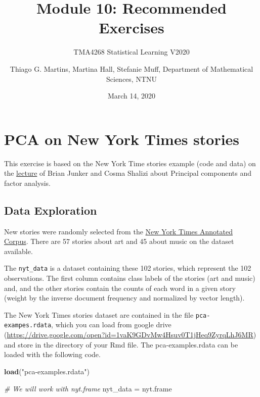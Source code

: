 \documentclass[]{article}
\title{Module 10: Recommended Exercises}
\subtitle{TMA4268 Statistical Learning V2020}
\author{Thiago G. Martins, Martina Hall, Stefanie Muff, Department of
Mathematical Sciences, NTNU}
\date{March 14, 2020}
\newenvironment{Shaded}{\begin{snugshade}}{\end{snugshade}}
\newcommand{\CommentTok}[1]{\textcolor[rgb]{0.56,0.35,0.01}{\textit{#1}}}
\newcommand{\KeywordTok}[1]{\textcolor[rgb]{0.13,0.29,0.53}{\textbf{#1}}}
\newcommand{\NormalTok}[1]{#1}
\newcommand{\OperatorTok}[1]{\textcolor[rgb]{0.81,0.36,0.00}{\textbf{#1}}}
\newcommand{\StringTok}[1]{\textcolor[rgb]{0.31,0.60,0.02}{#1}}
\begin{document}
\maketitle

\hypertarget{pca-on-new-york-times-stories}{%
\section{PCA on New York Times
stories}\label{pca-on-new-york-times-stories}}

This exercise is based on the New York Time stories example (code and
data) on the \href{http://www.stat.cmu.edu/~cshalizi/490/10/}{lecture}
of Brian Junker and Cosma Shalizi about Principal components and factor
analysis.

\hypertarget{data-exploration}{%
\subsection{Data Exploration}\label{data-exploration}}

New stories were randomly selected from the
\href{https://catalog.ldc.upenn.edu/LDC2008T19}{New York Times Annotated
Corpus}. There are 57 stories about art and 45 about music on the
dataset available.

The \texttt{nyt\_data} is a dataset containing these 102 stories, which
represent the 102 observations. The first column contains class labels
of the stories (art and music) and, and the other stories contain the
counts of each word in a given story (weight by the inverse document
frequency and normalized by vector length).

The New York Times stories dataset are contained in the file
\texttt{pca-exampes.rdata}, which you can load from google drive
(\url{https://drive.google.com/open?id=1vaK9GDvMw4Hsuv0T1jHeq9ZyrqLhJ6MR})
and store in the directory of your Rmd file. The pca-examples.rdata can
be loaded with the following code.

\begin{Shaded}
\begin{Highlighting}[]
\KeywordTok{load}\NormalTok{(}\StringTok{"pca-examples.rdata"}\NormalTok{)}

\CommentTok{# We will work with nyt.frame}
\NormalTok{nyt_data =}\StringTok{ }\NormalTok{nyt.frame}
\end{Highlighting}
\end{Shaded}

\begin{Shaded}
\end{Shaded}
\end{document}
